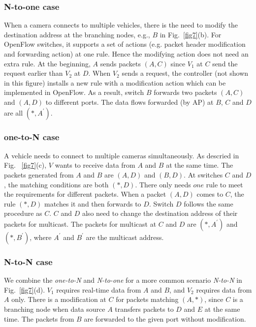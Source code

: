 \documentclass[journal]{IEEEtran}
\begin{document}
\subsubsection{N-to-one \rm{case}} \label{N to 1}

When a camera connects to multiple vehicles, there is the need to modify the destination address at the branching nodes, e.g., $B$ in Fig.~\ref{fig7}(b). For OpenFlow switches, it supports a set of actions (e.g. packet header modification and forwarding action) at one rule. Hence the modifying action does not need an extra rule. At the beginning, $A$ sends packets $(A, C)$ since $V_{1}$ at $C$ send the request earlier than $V_{2}$ at $D$. When $V_{2}$ sends a request, the controller (not shown in this figure) installs a new rule with a modification action which can be implemented in OpenFlow. As a result, switch $B$ forwards two packets $(A, C)$ and $(A, D)$ to different ports. The data flows forwarded (by AP) at $B$, $C$ and $D$ are all $(*, A^{'})$.



\subsubsection{one-to-N \rm{case}} \label{1 to N}

A vehicle needs to connect to multiple cameras simultaneously. As descried in Fig. ~\ref{fig7}(c), $V$ wants to receive data from $A$ and $B$ at the same time. The packets generated from $A$ and $B$ are $(A, D)$ and $(B, D)$. At switches $C$ and $D$, the matching conditions are both $(*, D)$. There only needs $one$ rule to meet the requirements for different packets. When a packet $(A, D)$ comes to $C$, the rule $(*,D)$ matches it and then forwards to $D$. Switch $D$ follows the same procedure as $C$. $C$ and $D$ also need to change the destination address of their packets for multicast. The packets for multicast at $C$ and $D$ are $(*, A^{'})$ and $(*,B^{'})$, where $A^{'}$ and $B^{'}$ are the multicast address.


\subsubsection{N-to-N \rm{case}} \label{N to N}

We combine the \textit{one-to-N} and \textit{N-to-one} for a more common scenario \textit{N-to-N} in Fig.~\ref{fig7}(d). $V_{1}$ requires real-time data from $A$ and $B$, and $V_{2}$ requires data from $A$ only. There is a modification at $C$ for packets matching $(A, *)$, since $C$ is a branching node when data source $A$ transfers packets to $D$ and $E$ at the same time. The packets from $B$ are forwarded to the given port without modification.
\end{document}
